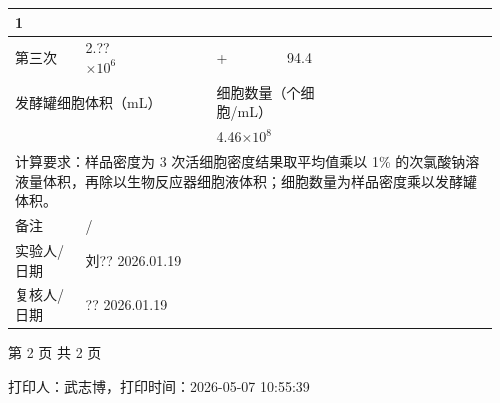 \documentclass[UTF8,10pt,a4paper,fontset=fandol]{ctexart}
\newcommand{\fieldvalue}[1]{#1}
\newcommand{\handwritten}[1]{#1}
\begin{document}
\begin{tabular}{|p{0.14\linewidth}|p{0.13\linewidth}|p{0.13\linewidth}|p{0.14\linewidth}|p{0.14\linewidth}|p{0.14\linewidth}|p{0.14\linewidth}|}
\fieldvalue{\handwritten{1}}\\
\hline
第三次&
\fieldvalue{\handwritten{2.??$\times 10^6$}}&
&
\fieldvalue{\handwritten{+}}&
\fieldvalue{\handwritten{94.4}}&
&\\
\hline
\multicolumn{3}{|l|}{发酵罐细胞体积（mL）}&
\multicolumn{2}{l|}{细胞数量（个细胞/mL）}&
\multicolumn{2}{l|}{}\\
\hline
\multicolumn{3}{|l|}{}&
\multicolumn{2}{l|}{
\fieldvalue{\handwritten{4.46$\times 10^8$}}}&
\multicolumn{2}{l|}{}\\
\hline
\multicolumn{7}{|p{\linewidth}|}{计算要求：样品密度为 3 次活细胞密度结果取平均值乘以 1\% 的次氯酸钠溶液量体积，再除以生物反应器细胞液体积；细胞数量为样品密度乘以发酵罐体积。}\\
\hline
备注&
\multicolumn{6}{l|}{
\fieldvalue{\handwritten{/}}}\\
\hline
实验人/日期&
\multicolumn{6}{l|}{
\fieldvalue{\handwritten{刘??}}
\hspace{1em}
\fieldvalue{\handwritten{2026.01.19}}}\\
\hline
复核人/日期&
\multicolumn{6}{l|}{
\fieldvalue{\handwritten{??}}
\hspace{1em}
\fieldvalue{\handwritten{2026.01.19}}}\\
\hline
\end{tabular}

\vfill

\begin{center}
第 2 页 共 2 页

\vspace{1em}

打印人：武志博，打印时间：2026-05-07 10:55:39
\end{center}
\end{document}
